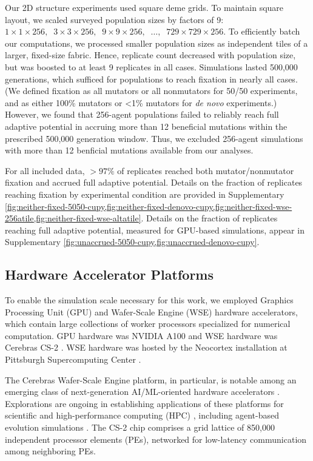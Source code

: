 Our 2D structure experiments used square deme grids.
To maintain square layout, we scaled surveyed population sizes by factors of 9: $1 \times 1 \times 256,\;\; 3 \times 3 \times 256,\;\; 9 \times 9 \times 256,\;\; \ldots,\;\; 729 \times 729 \times 256$.
To efficiently batch our computations, we processed smaller population sizes as independent tiles of a larger, fixed-size fabric.
Hence, replicate count decreased with population size, but was boosted to at least 9 replicates in all cases.
Simulations lasted 500,000 generations, which sufficed for populations to reach fixation in nearly all cases.
(We defined fixation as all mutators or all nonmutators for 50/50 experiments, and as either 100\% mutators or <1\% mutators for \textit{de novo} experiments.)
However, we found that 256-agent populations failed to reliably reach full adaptive potential in accruing more than 12 beneficial mutations within the prescribed 500,000 generation window.
Thus, we excluded 256-agent simulations with more than 12 benficial mutations available from our analyses.

For all included data, $>97\%$ of replicates reached both mutator/nonmutator fixation and accrued full adaptive potential.
Details on the fraction of replicates reaching fixation by experimental condition are provided in Supplementary \cref{fig:neither-fixed-5050-cupy,fig:neither-fixed-denovo-cupy,fig:neither-fixed-wse-256atile,fig:neither-fixed-wse-altatile}.
Details on the fraction of replicates reaching full adaptive potential, measured for GPU-based simulations, appear in Supplementary \cref{fig:unaccrued-5050-cupy,fig:unaccrued-denovo-cupy}.

\subsection{Hardware Accelerator Platforms} \label{sec:hardware}

To enable the simulation scale necessary for this work, we employed Graphics Processing Unit (GPU) and Wafer-Scale Engine (WSE) hardware accelerators, which contain large collections of worker processors specialized for numerical computation.
GPU hardware was NVIDIA A100 and WSE hardware was Cerebras CS-2 \citep{choquette2021nvidia,cerebras2021wafer}.
WSE hardware was hosted by the Neocortex installation at Pittsburgh Supercomputing Center \citep{buitrago2021neocortex}.

The Cerebras Wafer-Scale Engine platform, in particular, is notable among an emerging class of next-generation AI/ML-oriented hardware accelerators \citep{lauterbach2021path}.
Explorations are ongoing in establishing applications of these platforms for scientific and high-performance computing (HPC) \citep{rocki2020fast,brown2023exploring,ltaief2023scaling,sai2023massively,brown2022distributed,luow2020using,woo2022distributed,tramm2024efficient,chen2024using,phillips2023solving,chen2024solving}, including agent-based evolution simulations \citep{moreno2024trackable}.
The CS-2 chip comprises a grid lattice of 850,000 independent processor elements (PEs), networked for low-latency communication among neighboring PEs.

